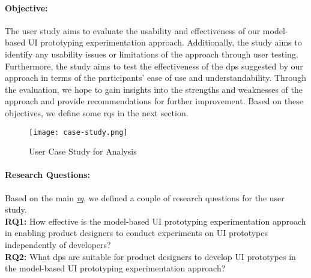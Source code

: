 
\paragraph{Objective:}
The user study aims to evaluate the usability and effectiveness of our model-based UI prototyping experimentation approach. 
Additionally, the study aims to identify any usability issues or limitations of the approach through user testing. 
Furthermore, the study aims to test the effectiveness of the \ac{dp}s suggested by our approach in terms of the participants' ease of use and understandability. 
Through the evaluation, we hope to gain insights into the strengths and weaknesses of the approach and provide recommendations for further improvement.
Based on these objectives, we define some \ac{rq}s in the next section.

\begin{figure}[ht]
  \centering
  \texttt{[image: case-study.png]}
  \caption{User Case Study for Analysis}
  \label{evaluation:fig:casestudy}
\end{figure}

\paragraph{Research Questions:}
Based on the main \textit{\hyperref[introduction:section:research]{\ac{rq}}}, we defined a couple of research questions for the user study. \\
\textbf{RQ1:} How effective is the model-based UI prototyping experimentation approach in enabling product designers to conduct experiments on UI prototypes independently of developers? \\
\textbf{RQ2:} What \ac{dp}s are suitable for product designers to develop UI prototypes in the model-based UI prototyping experimentation approach?

